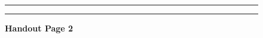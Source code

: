 \documentclass[]{article}
\begin{document}
\begin{figure}[!ht]
    \hrule
    \caption{ \textbf{Handout Page 2} }
    \begin{center}
    \end{center}
    \label{fig:handout-2}
    \hrule
\end{figure}

\newpage
\end{document}
